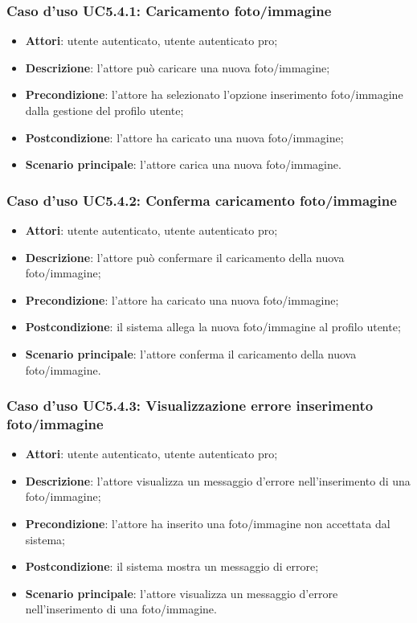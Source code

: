 \subsubsection{Caso d'uso UC5.4.1: Caricamento foto/immagine}

\begin{itemize}
	\item \textbf{Attori}: utente autenticato, utente autenticato pro;
	\item \textbf{Descrizione}: l'attore può caricare una nuova foto/immagine;
	\item \textbf{Precondizione}: l'attore ha selezionato l'opzione inserimento foto/immagine dalla gestione del profilo utente;  
	\item \textbf{Postcondizione}: l'attore ha caricato una nuova foto/immagine;
	\item \textbf{Scenario principale}: l'attore carica una nuova foto/immagine.
\end{itemize}

\subsubsection{Caso d'uso UC5.4.2: Conferma caricamento foto/immagine}

\begin{itemize}
	\item \textbf{Attori}: utente autenticato, utente autenticato pro;
	\item \textbf{Descrizione}: l'attore può confermare il caricamento della nuova foto/immagine;
	\item \textbf{Precondizione}: l'attore ha caricato una nuova foto/immagine;
	\item \textbf{Postcondizione}: il sistema allega la nuova foto/immagine al profilo utente;
	\item \textbf{Scenario principale}: l'attore conferma il caricamento della nuova foto/immagine.
\end{itemize}

\subsubsection{Caso d'uso UC5.4.3: Visualizzazione errore inserimento foto/immagine}
\begin{itemize}
	\item \textbf{Attori}: utente autenticato, utente autenticato pro;
	\item \textbf{Descrizione}: l'attore visualizza un messaggio d'errore nell'inserimento di una foto/immagine;
	\item \textbf{Precondizione}: l'attore ha inserito una foto/immagine non accettata dal sistema;
	\item \textbf{Postcondizione}: il sistema mostra un messaggio di errore;
	\item \textbf{Scenario principale}: l'attore visualizza un messaggio d'errore nell'inserimento di una foto/immagine.
\end{itemize}

